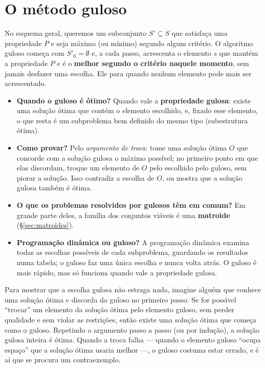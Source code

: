 \section{O método guloso}\label{sec:guloso}
No esquema geral, queremos um subconjunto $S'\subseteq S$ que satisfaça uma propriedade $P$ e seja máximo (ou mínimo) segundo algum critério. O algoritmo guloso começa com $S'_0=\emptyset$ e, a cada passo, acrescenta o elemento $s$ que mantém a propriedade $P$ e é o \textbf{melhor segundo o critério naquele momento}, sem jamais desfazer uma escolha. Ele para quando nenhum elemento pode mais ser acrescentado.
\begin{itemize}
  \item \textbf{Quando o guloso é ótimo?} Quando vale a \textbf{propriedade gulosa}: existe uma solução ótima que contém o elemento escolhido, e, fixado esse elemento, o que resta é um subproblema bem definido do mesmo tipo (subestrutura ótima).
  \item \textbf{Como provar?} Pelo \emph{argumento de troca}: tome uma solução ótima $O$ que concorde com a solução gulosa o máximo possível; no primeiro ponto em que elas discordam, troque um elemento de $O$ pelo escolhido pelo guloso, sem piorar a solução. Isso contradiz a escolha de $O$, ou mostra que a solução gulosa também é ótima.
  \item \textbf{O que os problemas resolvidos por gulosos têm em comum?} Em grande parte deles, a família dos conjuntos viáveis é uma \textbf{matroide} (§\ref{sec:matroides}).
  \item \textbf{Programação dinâmica ou guloso?} A programação dinâmica examina todas as escolhas possíveis de cada subproblema, guardando os resultados numa tabela; o guloso faz uma única escolha e nunca volta atrás. O guloso é mais rápido, mas só funciona quando vale a propriedade gulosa.
\end{itemize}

\begin{intuicao}
Para mostrar que a escolha gulosa não estraga nada, imagine alguém que conhece uma solução ótima e discorda do guloso no primeiro passo. Se for possível ``trocar'' um elemento da solução ótima pelo elemento guloso, sem perder qualidade e sem violar as restrições, então existe uma solução ótima que começa como o guloso. Repetindo o argumento passo a passo (ou por indução), a solução gulosa inteira é ótima. Quando a troca falha --- quando o elemento guloso ``ocupa espaço'' que a solução ótima usaria melhor ---, o guloso costuma estar errado, e é aí que se procura um contraexemplo.
\end{intuicao}

